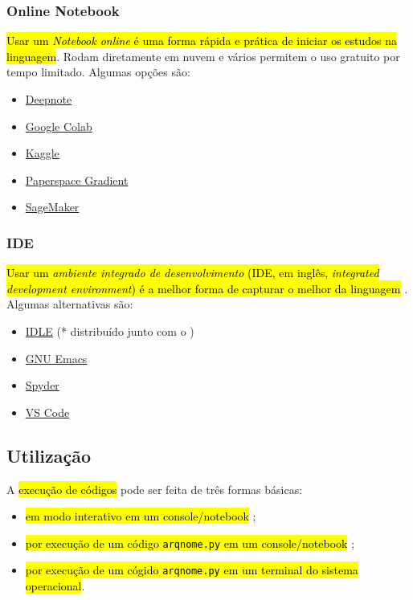 \documentclass[12pt]{article}
\begin{document}
\subsubsection{Online Notebook}

\hl{Usar um \emph{\textit{Notebook} {\python} \textit{online}} é uma forma rápida e prática de iniciar os estudos na linguagem}. Rodam diretamente em nuvem e vários permitem o uso gratuito por tempo limitado. Algumas opções são:
\begin{itemize}
\item \href{https://deepnote.com}{Deepnote}
\item \href{https://colab.research.google.com/}{Google Colab}
\item \href{https://www.kaggle.com/}{Kaggle}
\item \href{https://www.paperspace.com/notebooks}{Paperspace Gradient}
\item \href{https://aws.amazon.com/sagemaker/}{SageMaker}
\end{itemize}

\subsubsection{IDE}

\hl{Usar um \emph{ambiente integrado de desenvolvimento} (IDE, em inglês, \textit{integrated development environment}) é a melhor forma de capturar o melhor da linguagem {\python}}. Algumas alternativas são:
\begin{itemize}
\item \href{https://docs.python.org/3/library/idle.html}{IDLE} (* distribuído junto com o {\python})
\item \href{https://www.gnu.org/software/emacs/download.html}{GNU Emacs}
\item \href{https://www.spyder-ide.org/}{Spyder}
\item \href{https://code.visualstudio.com/}{VS Code}
\end{itemize}

\subsection{Utilização}

A \hl{execução de códigos {\python}} pode ser feita de três formas básicas:
\begin{itemize}
\item \hl{em modo interativo em um console/notebook {\python}};
\item \hl{por execução de um código \texttt{arqnome.py} em um console/notebook {\python}};
\item \hl{por execução de um cógido \texttt{arqnome.py} em um terminal do sistema operacional}.
\end{itemize}
\end{document}
